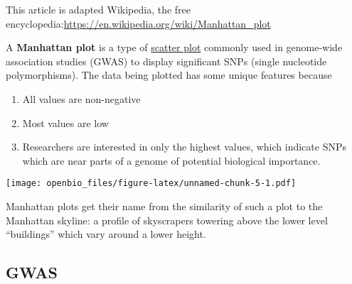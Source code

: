 \documentclass[
]{book}
\newenvironment{Shaded}{\begin{snugshade}}{\end{snugshade}}
\newcommand{\AttributeTok}[1]{\textcolor[rgb]{0.77,0.63,0.00}{#1}}
\newcommand{\CommentTok}[1]{\textcolor[rgb]{0.56,0.35,0.01}{\textit{#1}}}
\newcommand{\ConstantTok}[1]{\textcolor[rgb]{0.00,0.00,0.00}{#1}}
\newcommand{\DocumentationTok}[1]{\textcolor[rgb]{0.56,0.35,0.01}{\textbf{\textit{#1}}}}
\newcommand{\FloatTok}[1]{\textcolor[rgb]{0.00,0.00,0.81}{#1}}
\newcommand{\FunctionTok}[1]{\textcolor[rgb]{0.00,0.00,0.00}{#1}}
\newcommand{\NormalTok}[1]{#1}
\newcommand{\StringTok}[1]{\textcolor[rgb]{0.31,0.60,0.02}{#1}}
\providecommand{\tightlist}{%
  \setlength{\itemsep}{0pt}\setlength{\parskip}{0pt}}
\begin{document}
This article is adapted Wikipedia, the free encyclopedia:\url{https://en.wikipedia.org/wiki/Manhattan_plot}

A \textbf{Manhattan plot} is a type of \href{https://en.wikipedia.org/wiki/Scatter_plot}{scatter plot} commonly used in genome-wide association studies (GWAS) to display significant SNPs (single nucleotide polymorphisms). The data being plotted has some unique features because

\begin{enumerate}
\def\labelenumi{\arabic{enumi}.}
\tightlist
\item
  All values are non-negative
\item
  Most values are low
\item
  Researchers are interested in only the highest values, which indicate SNPs which are near parts of a genome of potential biological importance.
\end{enumerate}

\begin{Shaded}
\end{Shaded}

\texttt{[image: openbio\_files/figure-latex/unnamed-chunk-5-1.pdf]}

Manhattan plots get their name from the similarity of such a plot to the Manhattan skyline: a profile of skyscrapers towering above the lower level ``buildings'' which vary around a lower height.

\hypertarget{gwas}{%
\subsection{GWAS}\label{gwas}}
\end{document}
